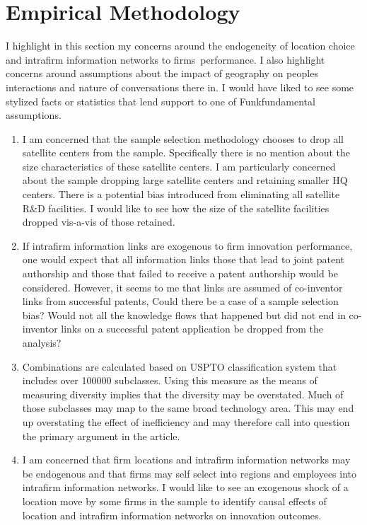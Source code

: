 \documentclass[12pt,letterpaper]{article}
\begin{document}
\section{Empirical Methodology}
I highlight in this section my concerns around the endogeneity of location choice and intrafirm information networks to firms\textquotesingle \ performance. I also highlight concerns around assumptions about the impact of geography on people\textquotesingle s  interactions and nature of conversations there in.  I would have liked to see some stylized facts or statistics that lend support to one of Funk\textquotesingle fundamental assumptions. 
\begin{enumerate}
  \item I am concerned that the sample selection methodology chooses to drop all satellite centers from the sample. Specifically there is no mention about the size characteristics of these satellite centers. I am particularly concerned about the sample dropping large satellite centers and retaining smaller HQ centers. There is a potential bias introduced from eliminating all satellite R\&D facilities. I would like to see how the size of the satellite facilities dropped vis-a-vis of those retained.
  \item If intrafirm information links are exogenous to firm innovation performance, one would expect that all information links those that lead to joint patent authorship and those that failed to receive a patent authorship would be considered. However, it seems to me that links are assumed of co-inventor links from successful patents, Could there be a case of a sample selection bias? Would not all the knowledge flows that happened but did not end in co-inventor links on a successful patent application be dropped from the analysis?
    \item Combinations are calculated based on USPTO classification system that includes over 100000 subclasses. Using this measure as the means of measuring diversity implies that the diversity may be overstated. Much of those subclasses may map to the same broad technology area. This may end up overstating the effect of inefficiency and may therefore call into question the primary argument in the article.
  \item I am concerned that firm locations and intrafirm information networks may be endogenous and that firms may self select into regions and employees into intrafirm information networks. I would like to see an exogenous shock of a location move by some firms in the sample to identify causal effects of location and intrafirm information networks on innovation outcomes.

\end{enumerate}
\end{document}
